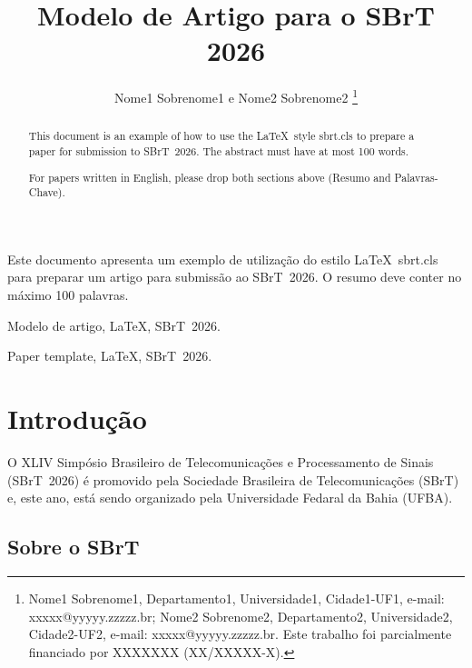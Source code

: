 \documentclass{sbrt}
\begin{document}
\title{Modelo de Artigo para o SBrT 2026}

\author{Nome1 Sobrenome1 e Nome2 Sobrenome2
\thanks{Nome1 Sobrenome1, Departamento1, Universidade1, Cidade1-UF1, e-mail: xxxxx@yyyyy.zzzzz.br; Nome2 Sobrenome2, Departamento2, Universidade2, Cidade2-UF2, e-mail: xxxxx@yyyyy.zzzzz.br. Este trabalho foi parcialmente financiado por XXXXXXX (XX/XXXXX-X).}%
}

\maketitle



\begin{resumo}
Este documento apresenta um exemplo de utiliza\c{c}\~{a}o do estilo \LaTeX\ sbrt.cls para preparar um artigo para submissão ao SBrT~2026. O resumo deve conter no máximo 100 palavras.
\end{resumo}
\begin{chave}
Modelo de artigo, \LaTeX, SBrT~2026.
\end{chave}


\begin{abstract}
This document is an example of how to use the \LaTeX\ style sbrt.cls to prepare a paper for submission to SBrT~2026. The abstract must have at most 100 words.

For papers written in English, please drop both sections above (Resumo and Palavras-Chave).
\end{abstract}
\begin{keywords}
Paper template, \LaTeX, SBrT~2026.
\end{keywords}


\section{Introdução}

O XLIV Simpósio Brasileiro de Telecomunicações e Processamento de Sinais (SBrT~2026) é promovido pela Sociedade Brasileira de Telecomunicações (SBrT) e, este ano, está sendo organizado pela Universidade Fedaral da Bahia (UFBA).


\subsection{Sobre o SBrT}
\end{document}
